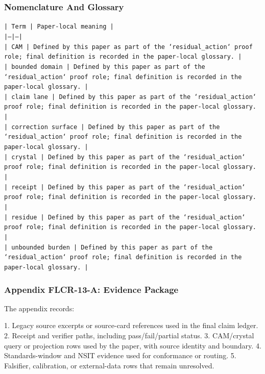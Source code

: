 \documentclass[11pt]{article}
\begin{document}
\subsubsection*{Nomenclature And Glossary}

\noindent\texttt{| Term | Paper-local meaning |}\\
\noindent\texttt{|---|---|}\\
\noindent\texttt{| CAM | Defined by this paper as part of the `residual\_action` proof role; final definition is recorded in the paper-local glossary. |}\\
\noindent\texttt{| bounded domain | Defined by this paper as part of the `residual\_action` proof role; final definition is recorded in the paper-local glossary. |}\\
\noindent\texttt{| claim lane | Defined by this paper as part of the `residual\_action` proof role; final definition is recorded in the paper-local glossary. |}\\
\noindent\texttt{| correction surface | Defined by this paper as part of the `residual\_action` proof role; final definition is recorded in the paper-local glossary. |}\\
\noindent\texttt{| crystal | Defined by this paper as part of the `residual\_action` proof role; final definition is recorded in the paper-local glossary. |}\\
\noindent\texttt{| receipt | Defined by this paper as part of the `residual\_action` proof role; final definition is recorded in the paper-local glossary. |}\\
\noindent\texttt{| residue | Defined by this paper as part of the `residual\_action` proof role; final definition is recorded in the paper-local glossary. |}\\
\noindent\texttt{| unbounded burden | Defined by this paper as part of the `residual\_action` proof role; final definition is recorded in the paper-local glossary. |}\\

\subsubsection*{Appendix FLCR-13-A: Evidence Package}

The appendix records:

1. Legacy source excerpts or source-card references used in the final claim ledger.
2. Receipt and verifier paths, including pass/fail/partial status.
3. CAM/crystal query or projection rows used by the paper, with source identity and boundary.
4. Standards-window and NSIT evidence used for conformance or routing.
5. Falsifier, calibration, or external-data rows that remain unresolved.
\end{document}
